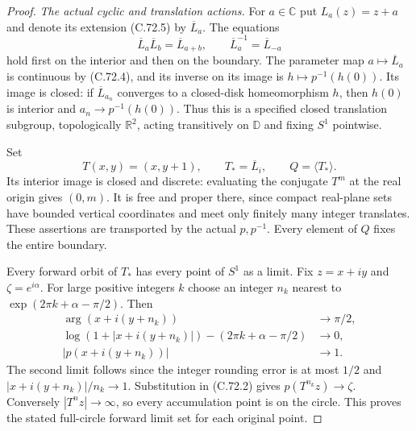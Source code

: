 \begin{proof}
\emph{The actual cyclic and translation actions.}
For $a\in\mathbb C$ put $L_a(z)=z+a$ and denote
its extension (C.72.5) by $\overline L_a$.
The equations
\[
 \overline L_a\overline L_b=\overline L_{a+b},
       \qquad\overline L_a^{-1}=\overline L_{-a}
                                                               \tag{C.72.6}
\]
hold first on the interior and then on the boundary.
The parameter map $a\mapsto\overline L_a$ is continuous
by (C.72.4), and its inverse on its image is
$h\mapsto p^{-1}(h(0))$. Its image is closed:
if $\overline L_{a_n}$ converges to a closed-disk
homeomorphism $h$, then $h(0)$ is interior and
$a_n\to p^{-1}(h(0))$. Thus this is a specified
closed translation subgroup, topologically $\mathbb R^2$,
acting transitively on $\mathbb D$ and fixing $S^1$
pointwise.

Set
\[
             T(x,y)=(x,y+1),\qquad
             T_*=\overline L_i,\qquad Q=\langle T_*\rangle.
                                                               \tag{C.72.7}
\]
Its interior image is closed and discrete: evaluating
the conjugate $T^m$ at the real origin gives $(0,m)$.
It is free and proper there, since compact real-plane
sets have bounded vertical coordinates and meet only
finitely many integer translates. These assertions
are transported by the actual $p,p^{-1}$.
Every element of $Q$ fixes the entire boundary.

Every forward orbit of $T_*$ has every point of
$S^1$ as a limit. Fix $z=x+iy$ and
$\zeta=e^{i\alpha}$. For large positive integers $k$
choose an integer $n_k$ nearest to
$\exp(2\pi k+\alpha-\pi/2)$. Then
\[
 \begin{split}
 \arg(x+i(y+n_k))&\longrightarrow\pi/2,\\
 \log(1+|x+i(y+n_k)|)
                -(2\pi k+\alpha-\pi/2)&\longrightarrow0,\\
 |p(x+i(y+n_k))|&\longrightarrow1.
 \end{split}                                                   \tag{C.72.8}
\]
The second limit follows since the integer rounding
error is at most $1/2$ and
$|x+i(y+n_k)|/n_k\to1$. Substitution in (C.72.2)
gives $p(T^{n_k}z)\to\zeta$.
Conversely $|T^n z|\to\infty$, so every accumulation
point is on the circle. This proves the stated
full-circle forward limit set for each original point.


\end{proof}
